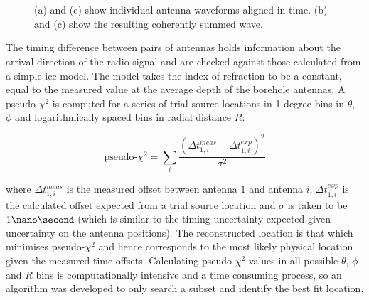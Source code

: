 \begin{figure}[htpb]
  \hfill
  \\
  \hfill
  \\
  \hfill
  \caption{(a) and (c) show individual antenna waveforms aligned in time. (b) and (c) show the resulting coherently summed wave.} 
  \label{fig:analysis:Reconstruction:CSW-Example}
\end{figure}


The timing difference between pairs of antennas holds information about the arrival direction of the radio signal and are checked against those calculated from a simple ice model. The model takes the index of refraction to be a constant, equal to the measured value at the average depth of the borehole antennas. A pseudo-$\chi^{2}$ is computed for a series of trial source locations in 1 degree bins in $\theta$, $\phi$ and logarithmically spaced bins in radial distance $R$:

\begin{equation}
  \mbox{pseudo-}\chi^{2} = \sum_{i} \frac{(\Delta t_{1,i}^{meas} - \Delta t_{1,i}^{exp})^{2}}{\sigma^{2}}
  \label{eq:analysis:Reconstruction:ChiSq}
\end{equation}


\noindent  where $\Delta t_{1,i}^{meas}$ is the measured offset between antenna $1$ and antenna $i$, $\Delta t_{1,i}^{exp}$ is the calculated offset expected from a trial source location and $\sigma$ is taken to be $1 \nano \second$ (which is similar to the timing uncertainty expected given uncertainty on the antenna positions). The reconstructed location is that which minimises pseudo-$\chi^{2}$ and hence corresponds to the most likely physical location given the measured time offsets. Calculating pseudo-$\chi^{2}$ values in all possible $\theta$, $\phi$ and $R$ bins is computationally intensive and a time consuming process, so an algorithm was developed to only search a subset and identify the best fit location.


